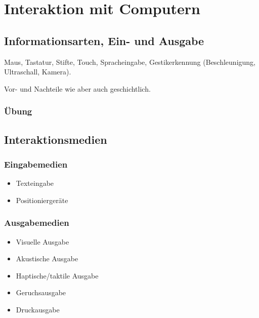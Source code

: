 \documentclass[a4paper]{article}
\title{\docTitle}
\author{Moritz}
\date{\today}
\begin{document}
\maketitle
\tableofcontents


\section{Interaktion mit Computern}

\subsection{Informationsarten, Ein- und Ausgabe}

Maus, Tastatur, Stifte, Touch, Spracheingabe, Gestikerkennung (Beschleunigung, Ultraschall, Kamera).

Vor- und Nachteile wie aber auch geschichtlich.

\subsubsection{Übung}

\subsection{Interaktionsmedien}


\subsubsection{Eingabemedien}

\begin{itemize}
    \item Texteingabe
    \item Positioniergeräte
\end{itemize}

\subsubsection{Ausgabemedien}

\begin{itemize}
    \item Visuelle Ausgabe
    \item Akustische Ausgabe
    \item Haptische/taktile Ausgabe
    \item Geruchsausgabe
    \item Druckausgabe
\end{itemize}
\end{document}
